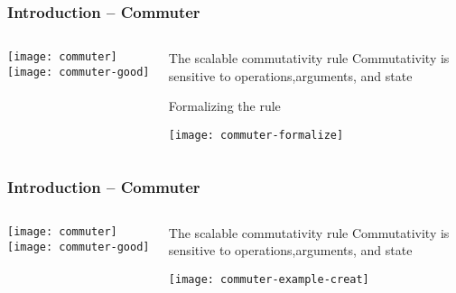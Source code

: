 \begin{frame}[plain]
	\frametitle{Introduction -- Commuter}
	
	
	\begin{columns}
		
		\begin{column}{.3\textwidth}	
			
			\texttt{[image: commuter]}
			\texttt{[image: commuter-good]}
			
		\end{column}
		
		\begin{column}{.7\textwidth}
			
			
			\begin{block}{The scalable commutativity rule}
			Commutativity	is sensitive to
			operations,arguments, and	state
			
			\end{block}
		    \Large 
		    Formalizing the rule
		    
			\texttt{[image: commuter-formalize]}
			
		\end{column}
		
	\end{columns}
	
	
\end{frame}	

\begin{frame}[plain]
	\frametitle{Introduction -- Commuter}
	
	
	\begin{columns}
		
		\begin{column}{.3\textwidth}	
			
			\texttt{[image: commuter]}
			\texttt{[image: commuter-good]}
			
		\end{column}
		
		\begin{column}{.7\textwidth}
			
			
			\begin{block}{The scalable commutativity rule}
				Commutativity	is sensitive to
				operations,arguments, and	state
				
			\end{block}
			\centering
			
			\texttt{[image: commuter-example-creat]}
			
		\end{column}
		
	\end{columns}
	
	
\end{frame}	



